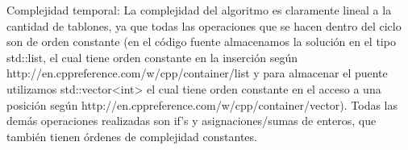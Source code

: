 \documentclass{article}
\begin{document}
\vspace{1.5cm}
{\noindent \Huge Complejidad temporal:}
\newline \newline
La complejidad del algoritmo es claramente lineal a la cantidad de tablones, ya que todas las operaciones que se hacen dentro del ciclo son de orden constante (en el c\'odigo fuente almacenamos la soluci\'on en el tipo std::list, el cual tiene orden constante en la inserci\'on seg\'un http://en.cppreference.com/w/cpp/container/list y para almacenar el puente utilizamos std::vector<int> el cual tiene orden constante en el acceso a una posici\'on seg\'un http://en.cppreference.com/w/cpp/container/vector). Todas las dem\'as operaciones realizadas son if's y asignaciones/sumas de enteros, que tambi\'en tienen \'ordenes de complejidad constantes.
\end{document}
